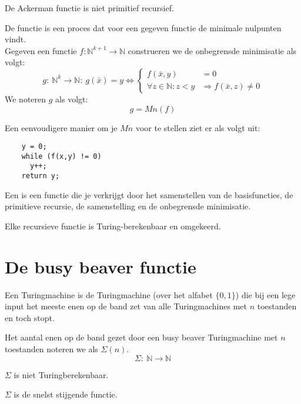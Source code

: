 \documentclass[main.tex]{subfiles}
\begin{document}
\begin{st}
  De Ackerman functie is niet primitief recursief.
\end{st}

\begin{de}
  De  functie is een proces dat voor een gegeven functie de minimale nulpunten vindt.\\
  Gegeven een functie $f: \mathbb{N}^{k+1} \rightarrow \mathbb{N}$ construeren we de onbegrensde minimisatie als volgt:
  \[
  g:\ \mathbb{N}^{k} \rightarrow \mathbb{N}:\ g(\bar{x}) = y
  \Leftrightarrow
  \left\{
    \begin{array}{rl}
      f(\bar{x},y) &= 0\\
      \forall z \in \mathbb{N}: z < y &\Rightarrow  f(\bar{x},z) \neq 0
    \end{array}
  \right.
  \]
  We noteren $g$ als volgt:
  \[ g = Mn(f) \]
\end{de}

\begin{opm}
  Een eenvoudigere manier om je $Mn$ voor te stellen ziet er als volgt uit:
  \begin{verbatim}
    y = 0;
    while (f(x,y) != 0)
      y++;
    return y;
  \end{verbatim}
\end{opm}

\begin{de}
  Een  is een functie die je verkrijgt door het samenstellen van de basisfuncties, de primitieve recursie, de samenstelling en de onbegrensde minimisatie.
\end{de}

\begin{st}
  Elke recursieve functie is Turing-berekenbaar en omgekeerd.
\end{st}


\section{De busy beaver functie}
\label{sec:de-busy-beaver}

\begin{de}
  Een  Turingmachine is de Turingmachine (over het alfabet $\{0,1\}$) die bij een lege input het meeste enen op de band zet van alle Turingmachines met $n$ toestanden en toch stopt.
\end{de}

\begin{de}
  Het aantal enen op de band gezet door een busy beaver Turingmachine met $n$ toestanden noteren we als $\Sigma(n)$.
  \[ \Sigma:\ \mathbb{N} \rightarrow \mathbb{N}  \]
\end{de}

\begin{st}
  $\Sigma$ is niet Turingberekenbaar.
\end{st}

\begin{st}
  $\Sigma$ is de snelst stijgende functie.
\end{st}
\end{document}
